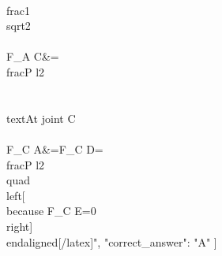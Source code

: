 {\\frac{1}{\\sqrt{2}} \\\\ F_{A C}&=\\frac{P l}{2}\\\\ \\text{At joint C} \\\\ F_{C A}&=F_{C D}=\\frac{P l}{2} \\quad\\left[\\because F_{C E}=0\\right] \\end{aligned}[/latex]",
    "correct_answer": "A"
  }
]

